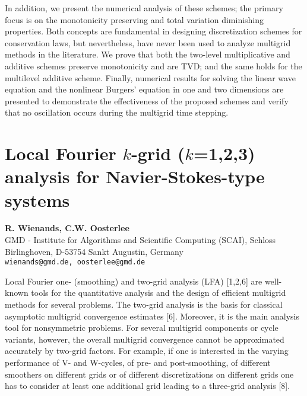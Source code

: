 \documentclass[11pt]{article}
\newcommand{\nextab}[4]{
	\section{#2}
	{\bf #1} \\ \nopagebreak
	{#3} \\ \nopagebreak
	{\tt #4} \nopagebreak
	}
\begin{document}
In addition, we present the numerical analysis of these schemes;
the primary focus is on the monotonicity preserving and total variation
diminishing properties. Both concepts are fundamental in designing
discretization schemes for conservation laws, but nevertheless, have never
been used to analyze multigrid methods in the literature.
We prove that both the two-level multiplicative and additive schemes
preserve monotonicity and are TVD; and the same holds for the multilevel
additive scheme.
Finally, numerical results for solving the linear wave equation and the
nonlinear Burgers' equation in one and two dimensions are presented to
demonstrate the effectiveness of the proposed schemes and verify that no
oscillation occurs during the multigrid time stepping.







\nextab
{R. Wienands, C.W. Oosterlee}
{Local Fourier $k$-grid ($k$=1,2,3) analysis for Navier-Stokes-type systems}
{GMD - Institute for Algorithms and Scientific Computing (SCAI),
Schloss Birlinghoven, D-53754 Sankt Augustin, Germany}
{wienands@gmd.de, oosterlee@gmd.de}


Local Fourier one- (smoothing) and two-grid analysis (LFA) [1,2,6] are
well-known tools for the quantitative analysis and the design of
efficient multigrid methods for several problems.
The two-grid analysis is the basis
for classical asymptotic multigrid convergence estimates [6].
Moreover, it is the main analysis tool for nonsymmetric problems.
For several multigrid components or cycle variants, however, the
overall multigrid convergence cannot be approximated accurately
by two-grid factors. For example, if one is interested in the varying
performance of V- and W-cycles, of pre- and post-smoothing, of
different smoothers on different grids or of different discretizations
on different grids one has to consider at least one additional grid
leading to a three-grid analysis [8].
\end{document}
